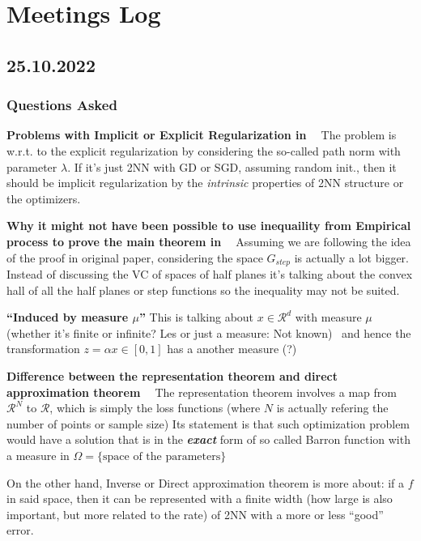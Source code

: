 \chapter{Meetings Log}

\section{25.10.2022}

\subsection{Questions Asked}

\textbf{Problems with Implicit or Explicit Regularization in ~\cite{ePrioriEstimatesPopulation2019}}
The problem is w.r.t. to the explicit regularization by considering the
so-called path norm with parameter $\lambda$. If it's just 2NN with GD or SGD,
assuming random init., then it should be implicit regularization by the
\textit{intrinsic} properties of 2NN structure or the optimizers.

\textbf{Why it might not have been possible to use inequaility from Empirical process to prove the main theorem in ~\cite{barronUniversalApproximationBounds1993}}
Assuming we are following the idea of the proof in original paper, considering the 
space $G_{step}$ is actually a lot bigger. Instead of discussing the VC of spaces of half planes
it's talking about the convex hall of all the half planes or step functions so the inequality 
may not be suited.

\textbf{``Induced by measure $\mu$''}
This is talking about $x \in \mathcal{R}^d$ with measure $\mu$ 
(whether it's finite or infinite? Les or just a measure: Not known) \
and hence the transformation $z = \alpha x \in [0, 1]$ has a another measure (?)

\textbf{Difference between the representation theorem and direct approximation theorem ~\cite{parhiBanachSpaceRepresenter2021}}
The representation theorem involves a map from $\mathcal{R}^N$ to $\mathcal{R}$, which is simply 
the loss functions (where $N$ is actually refering the number of points or sample size)
Its statement is that such optimization problem would have a solution that is 
in the \textbf{\textit{exact}} form of so called Barron function with a measure in 
$\Omega = \{\text{space of the parameters}\}$

On the other hand, Inverse or Direct approximation theorem is more about:
if a $f$ in said space, then it can be represented with a finite width (how large is also important, but more related to the rate)
of 2NN with a more or less ``good'' error.

